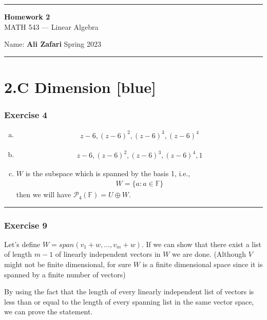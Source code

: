 \documentclass[12pt, letterpaper]{scrartcl}
\newcommand{\F}{\mathbb{F}}
\begin{document}
\begin{center}
    \hrule
    \vspace{0.4cm}
    { \textbf{{\large Homework 2}} \\ MATH 543 --- Linear Algebra}
\end{center}
{ Name: \textbf{Ali Zafari} \hspace{\fill} Spring 2023 } \newline\hrule

\section*{2.C Dimension \xrfill[2pt]{3pt}[blue]}
\subsubsection*{Exercise 4}
\begin{enumerate}[(a)]
    \item 
    \begin{align*}
        z-6, (z-6)^2, (z-6)^3, (z-6)^4    
    \end{align*}

    \item 
    \begin{align*}
        z-6, (z-6)^2, (z-6)^3, (z-6)^4, 1    
    \end{align*}
    
    \item $W$ is the subspace which is spanned by the basis 1, i.e., 
    \begin{align*}
        W=\{a: a\in \F\}
    \end{align*}
    then we will have $\mathcal{P}_4(\F)=U\oplus W$.

\end{enumerate}
\vskip1mm\hrule

\subsubsection*{Exercise 9}
Let's define $W=span(v_1+w, \dots, v_m+w)$. If we can show that there exist a list of length $m-1$ of linearly independent vectors in $W$ we are done. (Although $V$ might not be finite dimensional, for sure $W$ is a finite dimensional space since it is spanned by a finite number of vectors) 

By using the fact that the length of every linearly independent list of vectors is less than or equal to the length of every spanning list in the same vector space, we can prove the statement.
\end{document}
